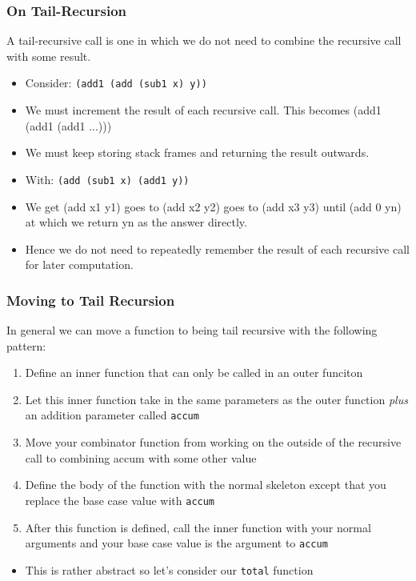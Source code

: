 \documentclass{beamer}
\begin{document}
\begin{frame}
  \frametitle{On Tail-Recursion}
  A tail-recursive call is one in which we do not need to combine
  the recursive call with some result.
  \begin{itemize}
  \item<2-> Consider: \texttt{(add1 (add (sub1 x) y))}
  \item<3-> We must increment the result of each recursive call. This
    becomes (add1 (add1 (add1 ...)))
  \item<4-> We must keep storing stack frames and returning the result
    outwards.
  \item<5-> With: \texttt{(add (sub1 x) (add1 y))}
  \item<6-> We get (add x1 y1) goes to (add x2 y2) goes to (add x3 y3)
    until (add 0 yn) at which we return yn as the answer directly.
  \item<7-> Hence we do not need to repeatedly remember the result of
    each recursive call for later computation.
  \end{itemize}
\end{frame}

\begin{frame}
  \frametitle{Moving to Tail Recursion}
  In general we can move a function to being tail recursive with the
  following pattern:
  \begin{enumerate}
  \item<2-> Define an inner function that can only be called in an outer
    funciton
  \item<3-> Let this inner function take in the same parameters as the outer
    function \emph{plus} an addition parameter called \texttt{accum}
  \item<4-> Move your combinator function from working on the outside of the recursive call to combining accum with some other value
  \item<5-> Define the body of the function with the normal skeleton except
    that you replace the base case value with \texttt{accum}
  \item<6-> After this function is defined, call the inner function with
    your normal arguments and your base case value is the argument to
    \texttt{accum}  
  \end{enumerate}
  \begin{itemize}
  \item<7-> This is rather abstract so let's consider our \texttt{total} function
  \end{itemize}
\end{frame}
\end{document}
